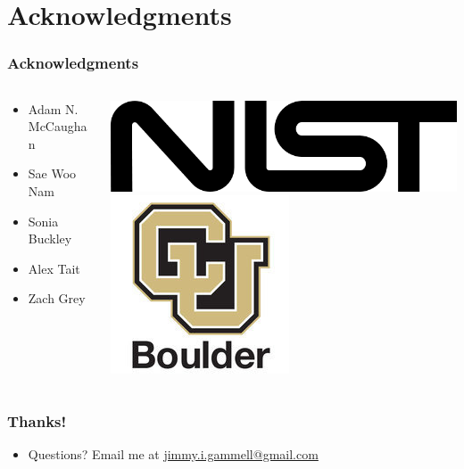 \documentclass[pdf]{beamer}
\begin{document}
\section{Acknowledgments}
\begin{frame}
\frametitle{Acknowledgments}
\begin{columns}
\begin{column}{.48\textwidth}
	\begin{itemize}
		\item Adam N. McCaughan
		\item Sae Woo Nam
		\item Sonia Buckley
		\item Alex Tait
		\item Zach Grey
	\end{itemize}
\end{column}
\begin{column}{.48\textwidth}
	\includegraphics[width=.8\textwidth]{figures/nist_logo.png}
	\\\vspace{.5cm}
	\includegraphics[width=.8\textwidth]{figures/cu_logo.jpg}
\end{column}
\end{columns}
\end{frame}

\begin{frame}
	\frametitle{Thanks!}
	\begin{itemize}
		\item Questions? Email me at \url{jimmy.i.gammell@gmail.com}
	\end{itemize}
\end{frame}
\end{document}

